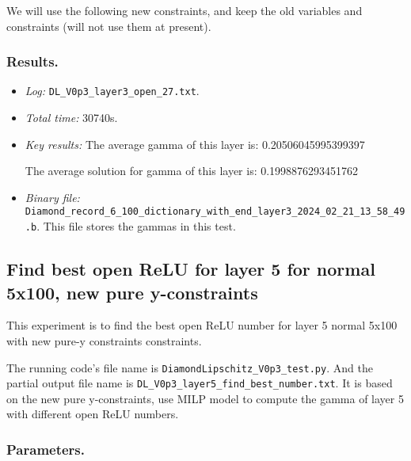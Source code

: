\documentclass{llncs}
\begin{document}
We will use the following new constraints, and keep the old variables and constraints (will not use them at present).

\subsubsection*{Results.}

\begin{itemize}
	\item \emph{Log:} \verb*|DL_V0p3_layer3_open_27.txt|.
	
	\item \emph{Total time:} 30740s.
	
	\item \emph{Key results:} The average gamma of this layer is:  0.20506045995399397
	
	The average solution for gamma of this layer is:  0.1998876293451762
	
	\item  \emph{Binary file:} \verb*|Diamond_record_6_100_dictionary_with_end_layer3_2024_02_21_13_58_49.b|. This file stores the gammas in this test.
	
\end{itemize}



\subsection{Find best open ReLU for layer 5 for normal 5x100, new pure y-constraints}

This experiment is to find the best open ReLU number for layer 5 normal 5x100 with new pure-y constraints constraints.

\vspace*{1ex}

The running code's file name is \verb*|DiamondLipschitz_V0p3_test.py|. And the partial output file name is \verb*|DL_V0p3_layer5_find_best_number.txt|.  It is based on the new pure y-constraints, use MILP model to compute the gamma of layer 5 with different open ReLU numbers.

\subsubsection*{Parameters.}
\end{document}
